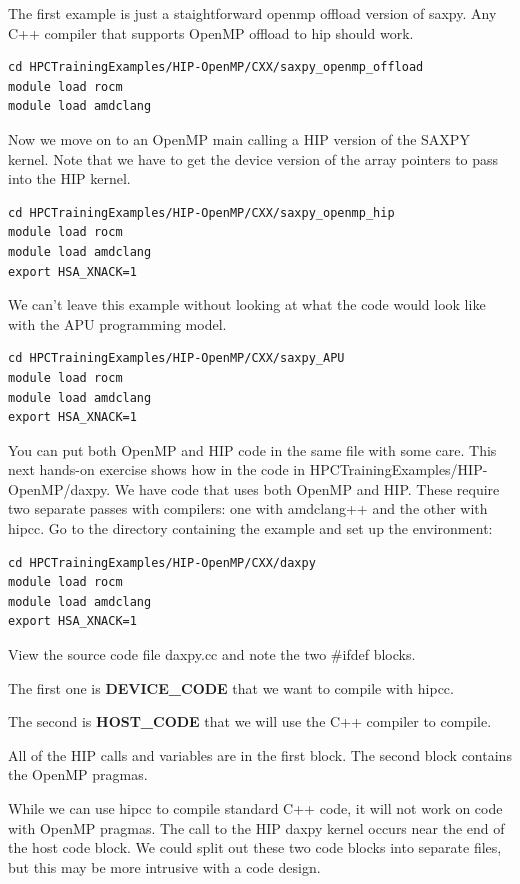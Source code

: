 \documentclass[
]{article}
\begin{document}
The first example is just a staightforward openmp offload version
of saxpy. Any C++ compiler that supports OpenMP offload to hip should
work.

\begin{verbatim}
cd HPCTrainingExamples/HIP-OpenMP/CXX/saxpy_openmp_offload
module load rocm
module load amdclang
\end{verbatim}

Now we move on to an OpenMP main calling a HIP version of the SAXPY
kernel. Note that we have to get the device version of the array
pointers to pass into the HIP kernel.

\begin{verbatim}
cd HPCTrainingExamples/HIP-OpenMP/CXX/saxpy_openmp_hip
module load rocm
module load amdclang
export HSA_XNACK=1
\end{verbatim}

We can't leave this example without looking at what the code would
look like with the APU programming model.

\begin{verbatim}
cd HPCTrainingExamples/HIP-OpenMP/CXX/saxpy_APU
module load rocm
module load amdclang
export HSA_XNACK=1
\end{verbatim}

You can put both OpenMP and HIP code in the same file with some care.
This next hands-on exercise shows how in the code in
HPCTrainingExamples/HIP-OpenMP/daxpy. We have code that uses both OpenMP
and HIP. These require two separate passes with compilers: one with
amdclang++ and the other with hipcc. Go to the directory containing the
example and set up the environment:

\begin{verbatim}
cd HPCTrainingExamples/HIP-OpenMP/CXX/daxpy
module load rocm
module load amdclang
export HSA_XNACK=1
\end{verbatim}

View the source code file daxpy.cc and note the two \#ifdef blocks.

The first one is \textbf{DEVICE\_CODE} that we want to compile with
hipcc.

The second is \textbf{HOST\_CODE} that we will use the C++ compiler to
compile.

All of the HIP calls and variables are in the first block. The second
block contains the OpenMP pragmas.

While we can use hipcc to compile standard C++ code, it will not work on
code with OpenMP pragmas. The call to the HIP daxpy kernel occurs near
the end of the host code block. We could split out these two code blocks
into separate files, but this may be more intrusive with a code design.
\end{document}
